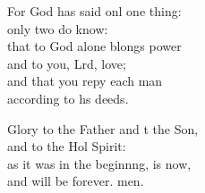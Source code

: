 \begin{psalmverse}
\begin{patverse}
For God has said onl one thing:\Med\\
only two do  know:\\
that to God alone blongs power\Med\\
and to you, Lrd, love;\\
and that you repy each man\Med\\
according to h\pointup{\i}s deeds.

Glory to the Father and t the Son,\Med\\
and to the Hol Spirit:\\
as it was in the beginn\pointup{\i}ng, is now,\Med\\
and will be forever. men. 
  \end{patverse}
\end{psalmverse}
